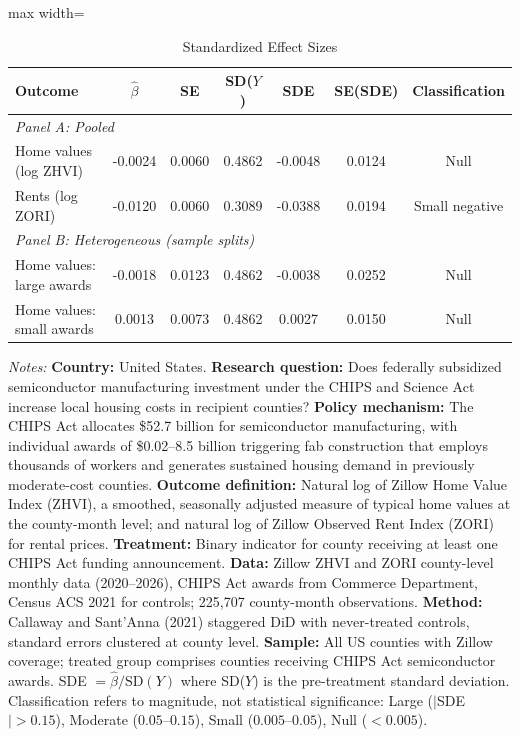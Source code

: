 \begin{table}[htbp]
\centering
\caption{Standardized Effect Sizes}
\label{tab:sde}
\begin{adjustbox}{max width=\textwidth}
\begin{tabular}{l cccccc}
\toprule
Outcome & $\hat{\beta}$ & SE & SD($Y$) & SDE & SE(SDE) & Classification \\
\midrule
\multicolumn{7}{l}{\textit{Panel A: Pooled}} \\
Home values (log ZHVI) & -0.0024 & 0.0060 & 0.4862 & -0.0048 & 0.0124 & Null \\
Rents (log ZORI) & -0.0120 & 0.0060 & 0.3089 & -0.0388 & 0.0194 & Small negative \\
\midrule
\multicolumn{7}{l}{\textit{Panel B: Heterogeneous (sample splits)}} \\
Home values: large awards & -0.0018 & 0.0123 & 0.4862 & -0.0038 & 0.0252 & Null \\
Home values: small awards & 0.0013 & 0.0073 & 0.4862 & 0.0027 & 0.0150 & Null \\
\bottomrule
\end{tabular}
\end{adjustbox}
\par\vspace{0.3em}\begin{minipage}{\textwidth}{\footnotesize
\textit{Notes:} \textbf{Country:} United States. \textbf{Research question:} Does federally subsidized semiconductor manufacturing investment under the CHIPS and Science Act increase local housing costs in recipient counties? \textbf{Policy mechanism:} The CHIPS Act allocates \$52.7 billion for semiconductor manufacturing, with individual awards of \$0.02--8.5 billion triggering fab construction that employs thousands of workers and generates sustained housing demand in previously moderate-cost counties. \textbf{Outcome definition:} Natural log of Zillow Home Value Index (ZHVI), a smoothed, seasonally adjusted measure of typical home values at the county-month level; and natural log of Zillow Observed Rent Index (ZORI) for rental prices. \textbf{Treatment:} Binary indicator for county receiving at least one CHIPS Act funding announcement. \textbf{Data:} Zillow ZHVI and ZORI county-level monthly data (2020--2026), CHIPS Act awards from Commerce Department, Census ACS 2021 for controls; 225,707 county-month observations. \textbf{Method:} Callaway and Sant'Anna (2021) staggered DiD with never-treated controls, standard errors clustered at county level. \textbf{Sample:} All US counties with Zillow coverage; treated group comprises counties receiving CHIPS Act semiconductor awards. SDE $= \hat{\beta} / \text{SD}(Y)$ where SD($Y$) is the pre-treatment standard deviation. Classification refers to magnitude, not statistical significance: Large ($|$SDE$| > 0.15$), Moderate ($0.05$--$0.15$), Small ($0.005$--$0.05$), Null ($< 0.005$).
}\end{minipage}
\end{table}

